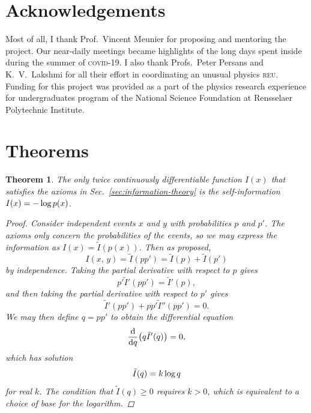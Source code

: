\documentclass[aps,reprint,floatfix]{revtex4-2}
\renewcommand\mathrm\textnormal%
\theoremstyle{plain}
\newtheorem{thm}{Theorem}[section]
\theoremstyle{definition}
\renewcommand\log{\operatorname{\mathrm{log}}}
\begin{document}
\section{Acknowledgements}

{\small
Most of all, I thank Prof.\ Vincent Meunier for proposing and mentoring the
project. Our near-daily meetings became highlights of the long days spent inside
during the summer of \textsc{covid-19}. I also thank Profs.\ Peter Persans and
K.\ V.\ Lakshmi for all their effort in coordinating an unusual physics
\textsc{reu}. Funding for this project was provided as a part of the physics
research experience for undergraduates program of the National Science
Foundation at Rensselaer Polytechnic Institute.
}

\appendix

\section{Theorems}

\begin{thm}\label{thm:self-information}
  The only twice continuously differentiable function $I(x)$ that satisfies the
  axioms in Sec.~\ref{sec:information-theory} is the self-information $I(x) =
  -\log p(x)$.
  \begin{proof}
    Consider independent events $x$ and $y$ with probabilities $p$ and $p'$. The
    axioms only concern the probabilities of the events, so we may express the
    information as $I(x) = \tilde{I}(p(x))$. Then as proposed,
    \[
      I(x,\, y)
      = \tilde{I}(pp')
      = \tilde{I}(p) + \tilde{I}(p')
    \]
    by independence. Taking the partial derivative with respect to $p$ gives
    \[
      p' \tilde{I}'(pp')
      = \tilde{I}'(p),
    \]
    and then taking the partial derivative with respect to $p'$ gives
    \[
      \tilde{I}'(pp') + pp' \tilde{I}''(pp')
      = 0.
    \]
    We may then define $q = pp'$ to obtain the differential equation
    \[
      \dv{q}\qty(q \tilde{I}'(q))
      = 0,
    \]
    which has solution
    \[
      \tilde{I}(q) = k\log q
    \]
    for real $k$. The condition that $\tilde{I}(q) \ge 0$ requires $k > 0$,
    which is equivalent to a choice of base for the logarithm.
  \end{proof}
\end{thm}
\end{document}
